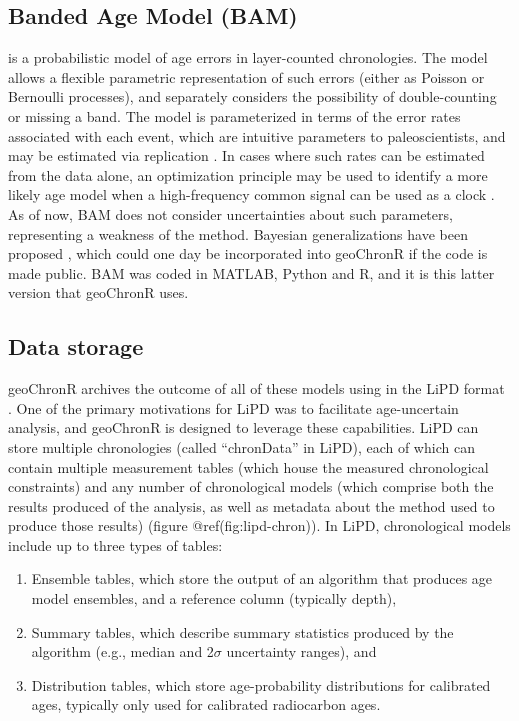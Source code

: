 \documentclass[gchron, manuscript]{copernicus}
\begin{document}
\subsection{Banded Age Model (BAM)}

\citet{BAM} is a probabilistic model of age errors in layer-counted
chronologies. The model allows a flexible parametric representation of
such errors (either as Poisson or Bernoulli processes), and separately
considers the possibility of double-counting or missing a band. The
model is parameterized in terms of the error rates associated with each
event, which are intuitive parameters to paleoscientists, and may be
estimated via replication \citep{DeLong_Paleo3_2013}. In cases where
such rates can be estimated from the data alone, an optimization
principle may be used to identify a more likely age model when a
high-frequency common signal can be used as a clock \citep{BAM}. As of
now, BAM does not consider uncertainties about such parameters,
representing a weakness of the method. Bayesian generalizations have
been proposed \citep{BoersCP2017}, which could one day be incorporated
into geoChronR if the code is made public. BAM was coded in MATLAB,
Python and R, and it is this latter version that geoChronR uses.

\hypertarget{sec:storage}{%
\subsection{Data storage}\label{sec:storage}}

geoChronR archives the outcome of all of these models using in the LiPD
format \citep{lipd_cp}. One of the primary motivations for LiPD was to
facilitate age-uncertain analysis, and geoChronR is designed to leverage
these capabilities. LiPD can store multiple chronologies (called
``chronData'' in LiPD), each of which can contain multiple measurement
tables (which house the measured chronological constraints) and any
number of chronological models (which comprise both the results produced
of the analysis, as well as metadata about the method used to produce
those results) (figure @ref(fig:lipd-chron)). In LiPD, chronological
models include up to three types of tables:

\begin{enumerate}
\def\labelenumi{\arabic{enumi}.}
\item
  Ensemble tables, which store the output of an algorithm that produces
  age model ensembles, and a reference column (typically depth),
\item
  Summary tables, which describe summary statistics produced by the
  algorithm (e.g., median and 2\(\sigma\) uncertainty ranges), and
\item
  Distribution tables, which store age-probability distributions for
  calibrated ages, typically only used for calibrated radiocarbon ages.
\end{enumerate}
\end{document}
